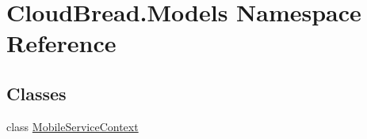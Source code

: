 \hypertarget{a00413}{}\section{Cloud\+Bread.\+Models Namespace Reference}
\label{a00413}
\subsection*{Classes}
\begin{DoxyCompactItemize}
\item 
class \hyperlink{a00147}{Mobile\+Service\+Context}
\end{DoxyCompactItemize}
